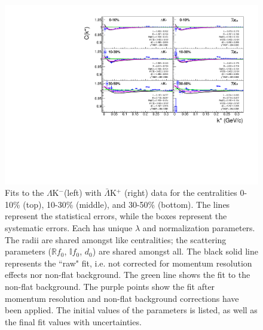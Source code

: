 \documentclass[../AnalysisNoteJBuxton.tex]{subfiles}
\begin{document}
\begin{figure}[h]
  \centering
  \includegraphics[width=\textwidth]{7_ResultsAndDiscussion/Figures/canKStarCfwFitsLamKchMwConj_0010_1030_3050_MomResCrctn_NonFlatBgdCrctn.pdf}
  \caption[$\Lambda$K$^{-}$($\bar{\Lambda}$K$^{+}$) Fits]{Fits to the $\Lambda$K$^{-}$(left) with $\bar{\Lambda}$K$^{+}$ (right) data for the centralities 0-10\% (top), 10-30\% (middle), and 30-50\% (bottom).
The lines represent the statistical errors, while the boxes represent the systematic errors.  
Each has unique $\lambda$ and normalization parameters.
The radii are shared amongst like centralities; the scattering parameters ($\mathbb{R}f_{0}$, $\mathbb{I}f_{0}$, $d_{0}$) are shared amongst all.
The black solid line represents the ``raw" fit, i.e. not corrected for momentum resolution effects nor non-flat background.  
The green line shows the fit to the non-flat background.
The purple points show the fit after momentum resolution and non-flat background corrections have been applied.
The initial values of the parameters is listed, as well as the final fit values with uncertainties.}
  \label{fig:LamKchMwConjFits}
\end{figure}
\end{document}
